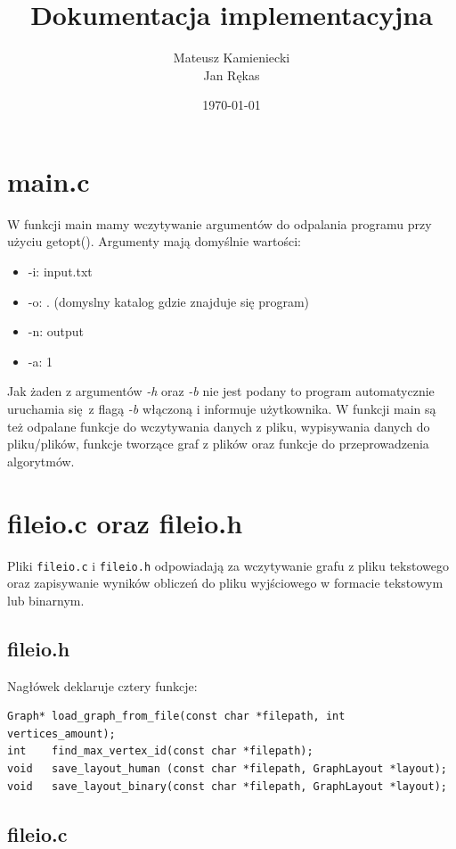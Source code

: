 \documentclass[12pt]{article}
\title{Dokumentacja implementacyjna}
\author{Mateusz Kamieniecki \\ Jan Rękas}
\date{\today}
\begin{document}
\maketitle

\tableofcontents

\section{main.c}
W funkcji main mamy wczytywanie argumentów do odpalania programu przy użyciu
getopt(). Argumenty mają domyślnie wartości:
\begin{itemize}
	\item -i: input.txt
	\item -o: . (domyslny katalog gdzie znajduje się program)
	\item -n: output
	\item -a: 1
\end{itemize}
Jak żaden z argumentów \textit{-h} oraz \textit{-b} nie jest podany to program
automatycznie uruchamia się z flagą \textit{-b} włączoną i informuje użytkownika. W
funkcji main są też odpalane funkcje do wczytywania danych z pliku, wypisywania
danych do pliku/plików, funkcje tworzące graf z plików oraz funkcje do
przeprowadzenia algorytmów.

\section{fileio.c oraz fileio.h}

Pliki \texttt{fileio.c} i \texttt{fileio.h} odpowiadają za wczytywanie grafu z pliku tekstowego
oraz zapisywanie wyników obliczeń do pliku wyjściowego w formacie tekstowym lub binarnym.

\subsection{fileio.h}

Nagłówek deklaruje cztery funkcje:

\begin{lstlisting}
Graph* load_graph_from_file(const char *filepath, int vertices_amount);
int    find_max_vertex_id(const char *filepath);
void   save_layout_human (const char *filepath, GraphLayout *layout);
void   save_layout_binary(const char *filepath, GraphLayout *layout);
\end{lstlisting}

\subsection{fileio.c}
\end{document}
